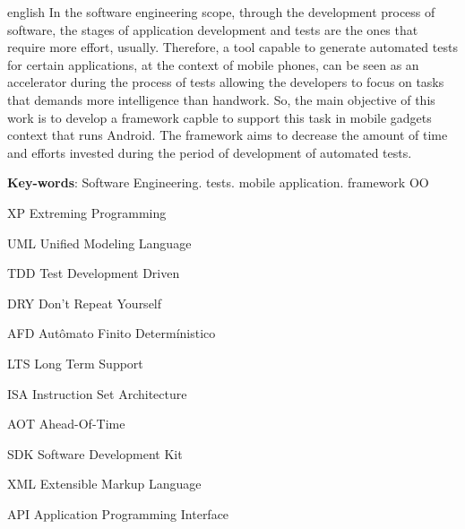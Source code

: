 \documentclass[
    12pt,       %
    openright,      %
    twoside,      %
    a4paper,      %
    english,      %
    french,       %
    spanish,      %
    brazil,       %
    ]{abntex2}
\begin{document}
  \begin{resumo}[Abstract]
   \begin{otherlanguage*}{english}
     In the software engineering scope, through the development process of
     software, the stages of application development and tests are the
     ones that require more effort, usually. Therefore, a tool capable to generate
     automated tests for certain applications, at the context of mobile
     phones, can be seen as an accelerator during the process of
     tests allowing the developers to focus on tasks that demands
     more intelligence than handwork. So, the main objective of this work
     is to develop a framework capble to support this task in mobile
     gadgets context that runs Android. The framework aims to decrease the amount of
     time and efforts invested during the period of development of automated tests.

     \vspace{\onelineskip}

     \noindent
     \textbf{Key-words}: Software Engineering. tests. mobile application. framework OO
   \end{otherlanguage*}
  \end{resumo}

  \listoffigures*
  \cleardoublepage

  \listoftables*
  \cleardoublepage

  \begin{siglas}
    \item[XP] Extreming Programming
    \item[UML] Unified Modeling Language
    \item[TDD] Test Development Driven
    \item[DRY] Don't Repeat Yourself
    \item[AFD] Autômato Finito Determínistico
    \item[LTS] Long Term Support
    \item[ISA] Instruction Set Architecture
    \item[AOT] Ahead-Of-Time
    \item[SDK] Software Development Kit
    \item[XML] Extensible Markup Language
    \item[API] Application Programming Interface
  \end{siglas}
\end{document}

